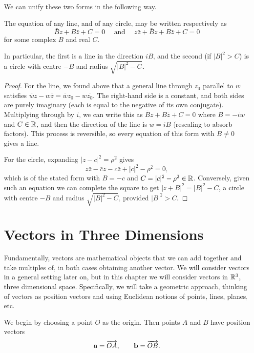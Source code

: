 \documentclass[a4paper]{scrartcl}
\begin{document}
We can unify these two forms in the following way.

\begin{proposition}
	The equation of any line, and of any circle, may be written respectively as
$$
\bar{B} z+ B \bar{z}+C=0 \quad \text { and } \quad z \bar{z}+\bar{B} z+B \bar{z}+C=0
$$
for some complex $B$ and real $C$.

In particular, the first is a line in the direction $iB$, and the second (if $|B|^2 > C$) is a circle with centre $-B$ and radius $\sqrt{|B|^2 - C}$.
\end{proposition}
\begin{proof}
	For the line, we found above that a general line through $z_0$ parallel to $w$ satisfies $\overline{w}z - w\overline{z} = \overline{w}z_0 - w\overline{z_0}$. The right-hand side is a constant, and both sides are purely imaginary (each is equal to the negative of its own conjugate). Multiplying through by $i$, we can write this as $\overline{B}z + B\overline{z} + C = 0$ where $B = -iw$ and $C \in \mathbb{R}$, and then the direction of the line is $w = iB$ (rescaling to absorb factors). This process is reversible, so every equation of this form with $B \neq 0$ gives a line.

	For the circle, expanding $|z - c|^2 = \rho^2$ gives
	$$
	z\bar{z} - \bar{c}z - c\bar{z} + |c|^2 - \rho^2 = 0,
	$$
	which is of the stated form with $B = -c$ and $C = |c|^2 - \rho^2 \in \mathbb{R}$. Conversely, given such an equation we can complete the square to get $|z + B|^2 = |B|^2 - C$, a circle with centre $-B$ and radius $\sqrt{|B|^2 - C}$, provided $|B|^2 > C$.
\end{proof}


\section{Vectors in Three Dimensions}

Fundamentally, vectors are mathematical objects that we can add together and take multiples of, in both cases obtaining another vector. We will consider vectors in a general setting later on, but in this chapter we will consider vectors in $\mathbb{R}^3$, three dimensional space. Specifically, we will take a geometric approach, thinking of vectors as position vectors and using Euclidean notions of points, lines, planes, etc.

We begin by choosing a point $O$ as the origin. Then points $A$ and $B$ have position vectors
$$
\mathbf{a} = \overrightarrow{OA}, \quad\quad \mathbf{b} = \overrightarrow{OB}.
$$
\end{document}
